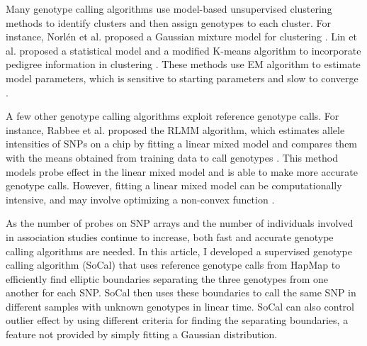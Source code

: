 \documentclass{scrartcl}
\begin{document}
\par
Many genotype calling algorithms use model-based unsupervised clustering
methods to identify clusters and then assign genotypes to each cluster.
For instance, Norl\'{e}n et al. proposed a Gaussian mixture model for
clustering \cite{norlen2008}.
Lin et al. proposed a statistical model and a modified
K-means algorithm to incorporate pedigree information in clustering
\cite{lin2008}.
These methods use EM algorithm to estimate model parameters, which is sensitive
to starting parameters and slow to converge \cite{wu1983}.

\par
A few other genotype calling algorithms exploit reference genotype calls.
For instance, Rabbee et al. proposed the RLMM algorithm, which estimates allele
intensities of SNPs on a chip by fitting a linear mixed model and compares
them with the means obtained from training data to call genotypes
\cite{rabbee2005}. 
This method models probe effect in the linear mixed model and is able to make
more accurate genotype calls.
However, fitting a linear mixed model can be computationally intensive, and
may involve optimizing a non-convex function \cite{zhou2014}.

\par
As the number of probes on SNP arrays and the number of individuals involved
in association studies continue to increase, both fast and accurate genotype
calling algorithms are needed.
In this article, I developed a supervised genotype calling algorithm (SoCal)
that uses reference genotype calls from HapMap to efficiently find elliptic
boundaries separating the three genotypes from one another for each SNP.
SoCal then uses these boundaries to call the same SNP in different samples with
unknown genotypes in linear time.
SoCal can also control outlier effect by using different criteria for finding
the separating boundaries, a feature not provided by simply fitting a Gaussian
distribution.
\end{document}
